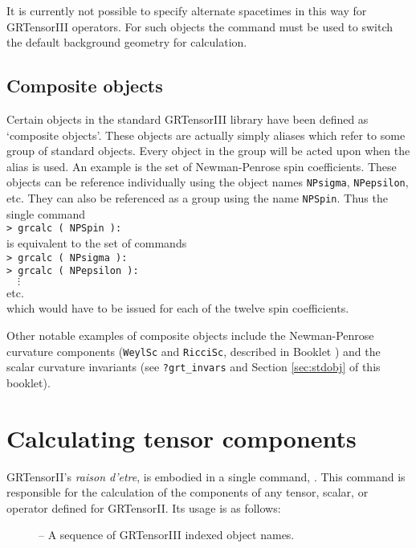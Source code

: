 \documentclass{article}
\begin{document}
It is currently not possible to specify alternate spacetimes in this way
for GRTensorIII operators. For such objects the  command
must be used to switch the default background geometry for calculation.
%
\subsection{Composite objects}
%
Certain objects in the standard GRTensorIII library have been defined
as `composite objects'. These objects are actually simply aliases
which refer to some group of standard objects. Every object in the
group will be acted upon when the alias is used. An example is the set
of Newman-Penrose spin coefficients. These objects can be reference
individually using the object names \texttt{NPsigma},
\texttt{NPepsilon}, etc. They can also be referenced as a group using
the name \texttt{NPSpin}. Thus the single command\\

\noindent\texttt{> grcalc ( NPSpin ):}\\

\noindent is equivalent to the set of commands\\

\noindent\texttt{> grcalc ( NPsigma ):}\\
\texttt{> grcalc ( NPepsilon ):}\\
$\quad\vdots$\\
etc.\\

\noindent which would have to be issued for each of the twelve spin
coefficients.

Other notable examples of composite objects include the Newman-Penrose
curvature components (\texttt{WeylSc} and \texttt{RicciSc}, described
in Booklet \grBasisRef) and the scalar curvature invariants (see
\texttt{?grt\_invars} and Section \ref{sec:stdobj} of this booklet).
%
\section{Calculating tensor components} \label{sec:grcalc}
%
GRTensorII's \textit{raison d'etre}, is embodied in a single command,
. This command is responsible for the calculation of the
components of any tensor, scalar, or operator defined for
GRTensorII. Its usage is as follows:\\
%
\begin{cmdspec}
  \label{spec:grcalc}

  \begin{description}
    \item[] -- A sequence of GRTensorIII indexed object names.
  \end{description}

\end{cmdspec}
\end{document}
